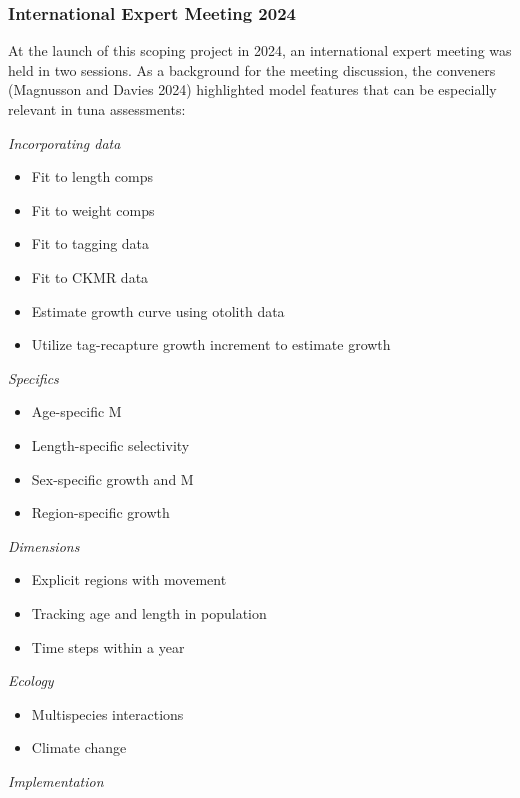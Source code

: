 \documentclass{SCreport}
\begin{document}
\subsubsection{International Expert Meeting 2024}

At the launch of this scoping project in 2024, an international expert meeting
was held in two sessions. As a background for the meeting discussion, the
conveners (Magnusson and Davies 2024) highlighted model features that can be
especially relevant in tuna assessments:

\textit{Incorporating data}

\begin{itemize}
  \item Fit to length comps
  \item Fit to weight comps
  \item Fit to tagging data
  \item Fit to CKMR data
  \item Estimate growth curve using otolith data
  \item Utilize tag-recapture growth increment to estimate growth
\end{itemize}

\textit{Specifics}

\begin{itemize}
  \item Age-specific M
  \item Length-specific selectivity
  \item Sex-specific growth and M
  \item Region-specific growth
\end{itemize}

\textit{Dimensions}

\begin{itemize}
  \item Explicit regions with movement
  \item Tracking age and length in population
  \item Time steps within a year
\end{itemize}

\textit{Ecology}

\begin{itemize}
  \item Multispecies interactions
  \item Climate change
\end{itemize}

\textit{Implementation}
\end{document}
